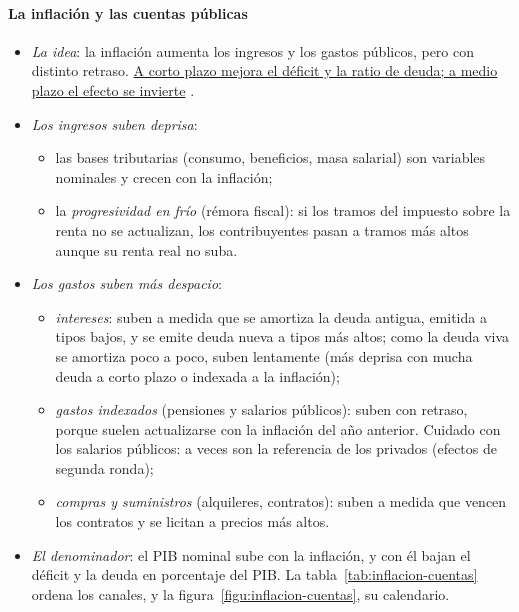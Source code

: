\documentclass[11pt]{article}
\begin{document}
\paragraph{La inflación y las cuentas públicas}
\begin{itemize}
\item \emph{La idea}: la inflación aumenta los ingresos y los gastos públicos, pero con distinto retraso. \uline{A corto plazo mejora el déficit y la ratio de deuda; a medio plazo el efecto se invierte} \parencite{FMI2023FiscalMonitor}.
\item \emph{Los ingresos suben deprisa}:
  \begin{itemize}
  \item las bases tributarias (consumo, beneficios, masa salarial) son variables nominales y crecen con la inflación;
  \item la \emph{progresividad en frío} (rémora fiscal): si los tramos del impuesto sobre la renta no se actualizan, los contribuyentes pasan a tramos más altos aunque su renta real no suba.
  \end{itemize}
\item \emph{Los gastos suben más despacio}:
  \begin{itemize}
  \item \emph{intereses}: suben a medida que se amortiza la deuda antigua, emitida a tipos bajos, y se emite deuda nueva a tipos más altos; como la deuda viva se amortiza poco a poco, suben lentamente (más deprisa con mucha deuda a corto plazo o indexada a la inflación);
  \item \emph{gastos indexados} (pensiones y salarios públicos): suben con retraso, porque suelen actualizarse con la inflación del año anterior. Cuidado con los salarios públicos: a veces son la referencia de los privados (efectos de segunda ronda);
  \item \emph{compras y suministros} (alquileres, contratos): suben a medida que vencen los contratos y se licitan a precios más altos.
  \end{itemize}
\item \emph{El denominador}: el PIB nominal sube con la inflación, y con él bajan el déficit y la deuda en porcentaje del PIB. La tabla~\ref{tab:inflacion-cuentas} ordena los canales, y la figura~\ref{figu:inflacion-cuentas}, su calendario.
\end{itemize}
\end{document}
